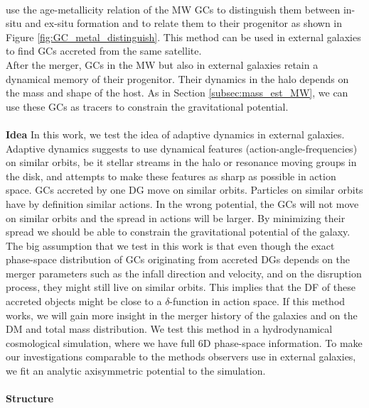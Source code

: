 \\\citet{Leaman...agemetall.MWGCs...2013} use the age-metallicity relation of the \ac{MW} \acp{GC} to distinguish them between in-situ and ex-situ formation and to relate them to their progenitor as shown in Figure \ref{fig:GC_metal_distinguish}. This method can be used in external galaxies to find \acp{GC} accreted from the same satellite.
\\
After the merger, \acp{GC} in the \ac{MW} but also in external galaxies retain a dynamical memory of their progenitor. Their dynamics in the halo depends on the mass and shape of the host. As in Section \ref{subsec:mass_est_MW}, we can use these \acp{GC} as tracers to constrain the gravitational potential.
\\\\
\textbf{Idea}
In this work, we test the idea of adaptive dynamics \citep{Binney...adaptivedynamics...2005} in external galaxies. Adaptive dynamics suggests to use dynamical features (action-angle-frequencies) on similar orbits, be it stellar streams in the halo or resonance moving groups in the disk, and attempts to make these features as sharp as possible in action space. \acp{GC} accreted by one \ac{DG} move on similar orbits. Particles on similar orbits have by definition similar actions. In the wrong potential, the \acp{GC} will not move on similar orbits and the spread in actions will be larger. By minimizing their spread we should be able to constrain the gravitational potential of the galaxy. The big assumption that we test in this work is that even though the exact phase-space distribution of \acp{GC} originating from accreted \acp{DG} depends on the merger parameters such as the infall direction and velocity, and on the disruption process, they might still live on similar orbits. This implies that the \ac{DF} of these accreted objects might be close to a $\delta$-function in action space. If this method works, we will gain more insight in the merger history of the galaxies and on the \ac{DM} and total mass distribution. We test this method in a hydrodynamical cosmological simulation, where we have full 6D phase-space information. To make our investigations comparable to the methods observers use in external galaxies, we fit an analytic axisymmetric potential to the simulation.
\\\\
\textbf{Structure}
